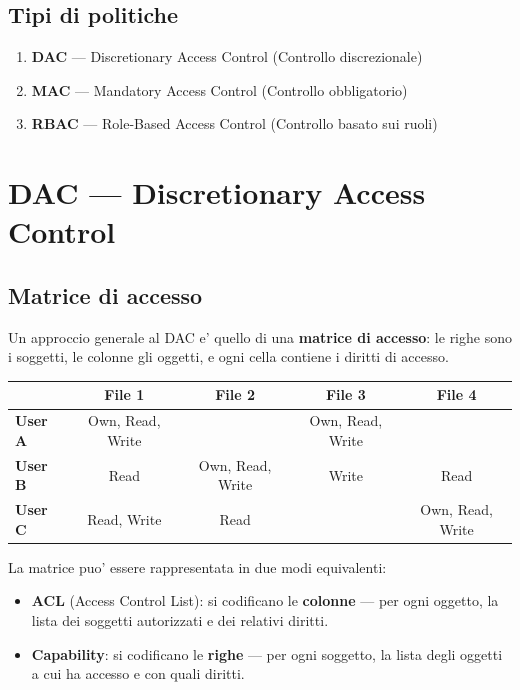 \subsection{Tipi di politiche}
\begin{enumerate}
  \item \textbf{DAC} — Discretionary Access Control (Controllo discrezionale)
  \item \textbf{MAC} — Mandatory Access Control (Controllo obbligatorio)
  \item \textbf{RBAC} — Role-Based Access Control (Controllo basato sui ruoli)
\end{enumerate}

\section{DAC — Discretionary Access Control}

\subsection{Matrice di accesso}
Un approccio generale al DAC e' quello di una \textbf{matrice di accesso}: le righe sono i soggetti, le colonne gli oggetti, e ogni cella contiene i diritti di accesso.

\begin{center}
  \footnotesize
  \begin{tabular}{|l|c|c|c|c|}
    \hline
    & \textbf{File 1} & \textbf{File 2} & \textbf{File 3} & \textbf{File 4} \\ \hline
    \textbf{User A} & Own, Read, Write & & Own, Read, Write & \\ \hline
    \textbf{User B} & Read & Own, Read, Write & Write & Read \\ \hline
    \textbf{User C} & Read, Write & Read & & Own, Read, Write \\ \hline
  \end{tabular}
\end{center}

La matrice puo' essere rappresentata in due modi equivalenti:
\begin{itemize}
  \item \textbf{ACL} (Access Control List): si codificano le \textbf{colonne} — per ogni oggetto, la lista dei soggetti autorizzati e dei relativi diritti.
  \item \textbf{Capability}: si codificano le \textbf{righe} — per ogni soggetto, la lista degli oggetti a cui ha accesso e con quali diritti.
\end{itemize}

